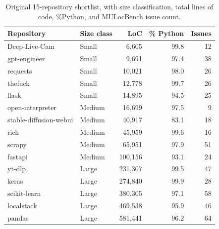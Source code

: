 
\begin{table}[htbp]
\centering
\caption{Original 15-repository shortlist, with size classification, total lines of code, \%Python, and MULocBench issue count.}
\label{tab:original-panel-summary}
\begin{tabular}{@{}l l r r r@{}}
\toprule
Repository & Size class & LoC & \% Python & Issues \\
\midrule
Deep-Live-Cam           & Small  &   6{,}605 & 99.8 & 12 \\
gpt-engineer             & Small  &   9{,}691 & 97.4 & 38 \\
requests                 & Small  &  10{,}021 & 98.0 & 26 \\
thefuck                  & Small  &  12{,}778 & 99.7 & 26 \\
flask                    & Small  &  14{,}895 & 94.5 & 25 \\
\addlinespace
open-interpreter         & Medium &  16{,}699 & 97.5 &  9 \\
stable-diffusion-webui   & Medium &  40{,}917 & 83.1 & 18 \\
rich                     & Medium &  45{,}959 & 99.6 & 16 \\
scrapy                   & Medium &  65{,}951 & 97.9 & 51 \\
fastapi                  & Medium & 100{,}156 & 93.1 & 24 \\
\addlinespace
yt-dlp                   & Large  & 231{,}307 & 99.5 & 47 \\
keras                    & Large  & 274{,}840 & 99.9 & 28 \\
scikit-learn             & Large  & 380{,}305 & 97.1 & 58 \\
localstack               & Large  & 469{,}538 & 95.9 & 46 \\
pandas                   & Large  & 581{,}441 & 96.2 & 64 \\
\bottomrule
\end{tabular}
\end{table}
